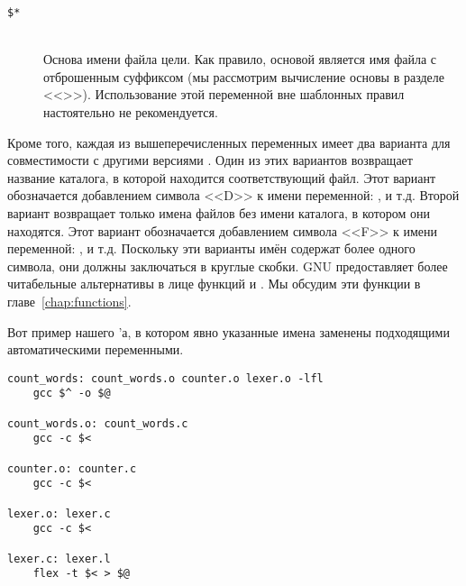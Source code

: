 \begin{description}
\item[\texttt{\$*}] \hfill \\
Основа имени файла цели. Как правило, основой является имя файла с
отброшенным суффиксом (мы рассмотрим вычисление основы в разделе
<<>>). Использование этой переменной вне
шаблонных правил настоятельно не рекомендуется.
\end{description}

Кроме того, каждая из вышеперечисленных переменных имеет два варианта
для совместимости с другими версиями \GNUmake{}. Один из этих вариантов
возвращает название каталога, в которой находится соответствующий
файл. Этот вариант обозначается добавлением символа <<D>> к имени
переменной: ,  и т.д. Второй
вариант возвращает только имена файлов без имени каталога, в котором
они находятся. Этот вариант обозначается добавлением символа <<F>> к
имени переменной: ,  и т.д.
Поскольку эти варианты имён содержат более одного символа, они должны
заключаться в круглые скобки. GNU \GNUmake{} предоставляет более
читабельные альтернативы в лице функций  и
. Мы обсудим эти функции в
главе~\ref{chap:functions}.

Вот пример нашего \Makefile{}'а, в котором явно указанные имена
заменены подходящими автоматическими переменными.

{\footnotesize
\begin{verbatim}
count_words: count_words.o counter.o lexer.o -lfl
    gcc $^ -o $@

count_words.o: count_words.c
    gcc -c $<

counter.o: counter.c
    gcc -c $<

lexer.o: lexer.c
    gcc -c $<

lexer.c: lexer.l
    flex -t $< > $@
\end{verbatim}
}
